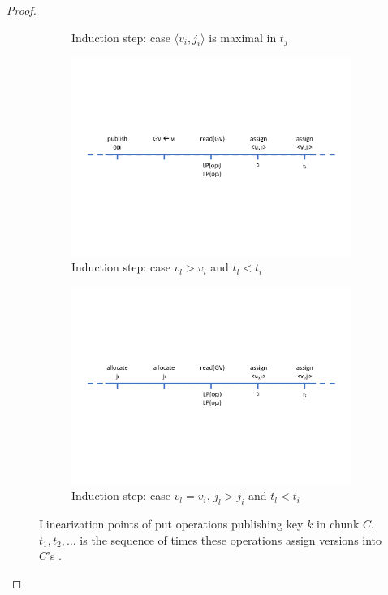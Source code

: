 \begin{proof}
\begin{figure}[tb]
\begin{subfigure}[t]{1.0\columnwidth}
      \caption[]{Induction step: case $\langle v_i, j_i\rangle$ is maximal in $t_j$ }
    \label{fig:proof-put-ind1}
  \end{subfigure}
  \begin{subfigure}[t]{1.0\columnwidth}
  \centering
      \includegraphics[scale=0.4]{proof-put-ind2.pdf}
      \caption[]{Induction step: case $v_l > v_i$ and $t_l<t_i$}
    \label{fig:proof-put-ind2}
  \end{subfigure}
  \begin{subfigure}[t]{1.0\columnwidth}
  \centering
      \includegraphics[scale=0.4]{proof-put-ind3.pdf}
      \caption[]{Induction step: case $v_l = v_i$, $j_l > j_i$ and $t_l<t_i$}
    \label{fig:proof-put-ind3}
  \end{subfigure}

\caption{Linearization points of put operations publishing key $k$ in chunk $C$. $t_1, t_2, \ldots $ is the sequence of times these operations assign versions into $C$'s .} 
\label{fig:proof-put}
\end{figure}




\end{proof}
